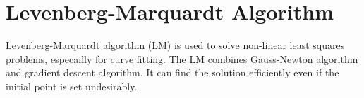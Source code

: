

\chapter{Levenberg-Marquardt Algorithm}


Levenberg-Marquardt algorithm (LM) is used to solve non-linear least squares problems, especailly for curve fitting. The
LM combines Gauss-Newton algorithm and gradient descent algorithm. It can find the solution efficiently even if the
initial point is set undesirably.

